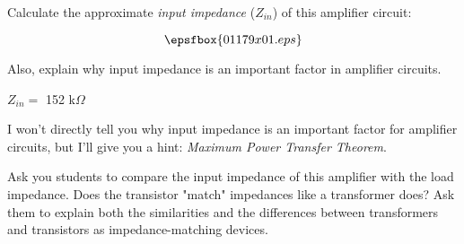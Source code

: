 

Calculate the approximate {\it input impedance} ($Z_{in}$) of this amplifier circuit:

$$\epsfbox{01179x01.eps}$$

Also, explain why input impedance is an important factor in amplifier circuits.







$Z_{in} =$ 152 k$\Omega$

\vskip 10pt

I won't directly tell you why input impedance is an important factor for amplifier circuits, but I'll give you a hint: {\it Maximum Power Transfer Theorem}.







Ask you students to compare the input impedance of this amplifier with the load impedance.  Does the transistor "match" impedances like a transformer does?  Ask them to explain both the similarities and the differences between transformers and transistors as impedance-matching devices.





